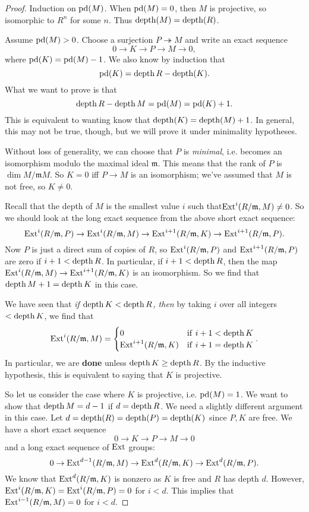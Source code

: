 \begin{proof}
Induction on $\mathrm{pd}(M)$. When $\mathrm{pd}(M)=0$, then $M$ is projective,
so isomorphic
to $R^n$ for some $n$. Thus $\operatorname{depth}(M) = \operatorname{depth}(R)$.

Assume $\mathrm{pd}(M) > 0$.
Choose a surjection $P \twoheadrightarrow M$ and write an exact
sequence
\[ 0 \to K \to P \to M \to 0,  \]
where $\mathrm{pd}(K) = \mathrm{pd}(M)-1$. We also know by induction that
\[ \mathrm{pd}(K) = \operatorname{depth} R - \operatorname{depth}(K).  \]
What we want to prove is that
\[ \operatorname{depth} R - \operatorname{depth} M = \mathrm{pd}(M) = \mathrm{pd}(K)+1.  \]
This is equivalent to wanting know that $\operatorname{depth}(K) = \operatorname{depth} (M)
+1$.
In general, this may not be true, though, but we will prove it
under
minimality hypotheses.

Without loss of generality, we can choose that $P$ is
\emph{minimal}, i.e.
becomes an isomorphism modulo the maximal ideal $\mathfrak{m}$.
This means
that the rank of $P$ is $\dim M/\mathfrak{m}M$.
So $K = 0$ iff $P \to M$ is an isomorphism; we've assumed that
$M$ is not
free, so $K \neq 0$.

Recall that the depth of $M$ is the smallest value $i$ such
that$\operatorname{Ext}^i(R/\mathfrak{m}, M) \neq 0$. So we should look at the long exact
sequence from the above short exact sequence:
\[ \operatorname{Ext}^i(R/\mathfrak{m}, P) \to  \operatorname{Ext}^i(R/\mathfrak{m},M)  \to
\operatorname{Ext}^{i+1}(R/\mathfrak{m}, K) \to \operatorname{Ext}^{i+1}(R/\mathfrak{m},
P).\]
Now $P$ is just a direct sum of copies of $R$, so
$\operatorname{Ext}^i(R/\mathfrak{m}, P)$
and $\operatorname{Ext}^{i+1}(R/\mathfrak{m}, P)$ are zero if $i+1< \operatorname{depth} R$.
In
particular, if $i+1< \operatorname{depth} R$, then the map $
\operatorname{Ext}^i(R/\mathfrak{m},M) \to
\operatorname{Ext}^{i+1}(R/\mathfrak{m}, K) $ is an isomorphism.
So we find that $\operatorname{depth} M + 1 = \operatorname{depth} K$ in this case.

We have seen that \emph{if $\operatorname{depth} K < \operatorname{depth} R$, then } by
taking $i$ over
all integers $< \operatorname{depth} K$, we find that
\[ \operatorname{Ext}^{i}(R/\mathfrak{m}, M) = \begin{cases}
0 & \mathrm{if \ } i+1 < \operatorname{depth} K \\
\operatorname{Ext}^{i+1}(R/\mathfrak{m},K) & \mathrm{if \ } i+1 = \operatorname{depth} K
\end{cases}. \]
In particular, we are \textbf{done} unless $\operatorname{depth} K \geq \operatorname{depth}
R$.
By the inductive hypothesis, this is equivalent to saying that
$K$ is
projective.

So let us consider the case where $K$ is projective, i.e.
$\mathrm{pd}(M)=1$.
We want to show that $\operatorname{depth} M = d-1$ if $d = \operatorname{depth} R$.
We need a
slightly different argument in this case. Let $d = \operatorname{depth}(R) =
\operatorname{depth} (P) =
\operatorname{depth}(K)$ since $P,K$ are free. We have a short exact sequence
\[ 0 \to K \to P \to M \to 0  \]
and a long exact sequence of $\operatorname{Ext}$ groups:
\[ 0 \to \operatorname{Ext}^{d-1}(R/\mathfrak{m}, M) \to
\operatorname{Ext}^d(R/\mathfrak{m}, K) \to \operatorname{Ext}^d(R/\mathfrak{m}, P) .\]
We know that $\operatorname{Ext}^d(R/\mathfrak{m}, K)$ is nonzero as $K$ is
free and $R$ has
depth $d$. However, $\operatorname{Ext}^i(R/\mathfrak{m}, K) =
\operatorname{Ext}^i(R/\mathfrak{m}, P)=0$
for $i<d$. This implies that $\operatorname{Ext}^{i-1}(R/\mathfrak{m}, M)=0$
for $i<d$.


\end{proof}
